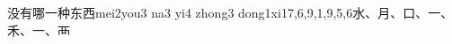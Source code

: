\begin{EntryWithPhonetic}{没有哪一种东西}{mei2you3 na3 yi4 zhong3 dong1xi1}{7,6,9,1,9,5,6}{⽔、⽉、⼝、⼀、⽲、⼀、⾑}
\end{EntryWithPhonetic}
